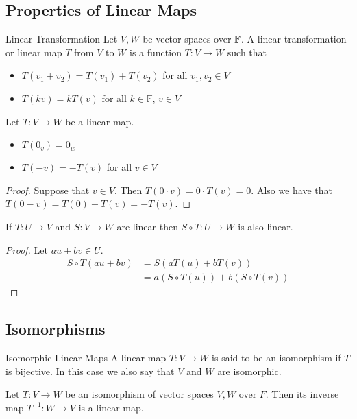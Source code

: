 \documentclass[a4paper]{article}
\begin{document}
\subsection{Properties of Linear Maps}
\begin{defn}{Linear Transformation}{} Let $V,W$ be vector spaces over $\mathbb{F}$. A linear transformation or linear map $T$ from $V$ to $W$ is a function $T:V\to W$ such that 
\begin{itemize}
\item $T(v_1+v_2)=T(v_1)+T(v_2)$ for all $v_1,v_2\in V$
\item $T(kv)=kT(v)$ for all $k\in\mathbb{F}$, $v\in V$
\end{itemize}
\end{defn}

\begin{lmm}{}{} Let $T:V\to W$ be a linear map. 
\begin{itemize}
\item $T(0_v)=0_w$
\item $T(-v)=-T(v)$ for all $v\in V$
\end{itemize}\tcbline
\begin{proof} Suppose that $v\in V$. Then $T(0\cdot v)=0\cdot T(v)=0$. Also we have that $T(0-v)=T(0)-T(v)=-T(v)$. 
\end{proof}
\end{lmm}

\begin{prp}{}{} If $T:U\to V$ and $S:V\to W$ are linear then $S\circ T:U\to W$ is also linear. \tcbline
\begin{proof} Let $au+bv\in U$. 
\begin{align*}
S\circ T(au+bv)&=S(aT(u)+bT(v))\\
&=a(S\circ T(u))+b(S\circ T(v))
\end{align*}
\end{proof}
\end{prp}

\subsection{Isomorphisms}
\begin{defn}{Isomorphic Linear Maps}{} A linear map $T:V\to W$ is said to be an isomorphism if $T$ is bijective. In this case we also say that $V$ and $W$ are isomorphic. 
\end{defn}

\begin{thm}{}{} Let $T:V\to W$ be an isomorphism of vector spaces $V,W$ over $F$. Then its inverse map $T^{-1}:W\to V$ is a linear map. 
\end{thm}
\end{document}
